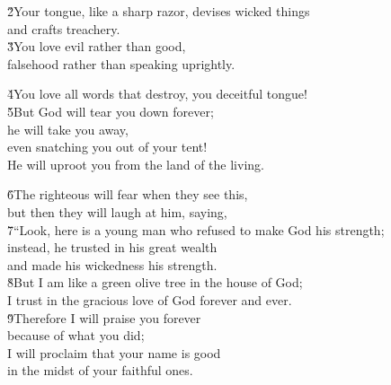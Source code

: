 \begin{poetry}
\poeml \v{2}Your tongue, like a sharp razor, devises wicked things \\
\poemll    and crafts treachery. \\
\poeml \v{3}You love evil rather than good, \\
\poemll    falsehood rather than speaking uprightly.
\end{poetry}

\begin{poetry}
\poeml \v{4}You love all words that destroy, you deceitful tongue! \\
\poeml \v{5}But God will tear you down forever; \\
\poemll    he will take you away, \\
\poemlll       even snatching you out of your tent! \\
\poeml He will uproot you from the land of the living.
\end{poetry}

\begin{poetry}
\poeml \v{6}The righteous will fear when they see this, \\
\poemll    but then they will laugh at him, saying, \\
\poeml \v{7}``Look, here is a young man who refused to make God his strength; \\
\poemll    instead, he trusted in his great wealth \\
\poemlll       and made his wickedness his strength. \\
\poeml \v{8}But I am like a green olive tree in the house of God; \\
\poemll    I trust in the gracious love of God forever and ever. \\
\poeml \v{9}Therefore I will praise you forever \\
\poemll    because of what you did; \\
\poeml I will proclaim that your name is good \\
\poemll    in the midst of your faithful ones.
\end{poetry}

